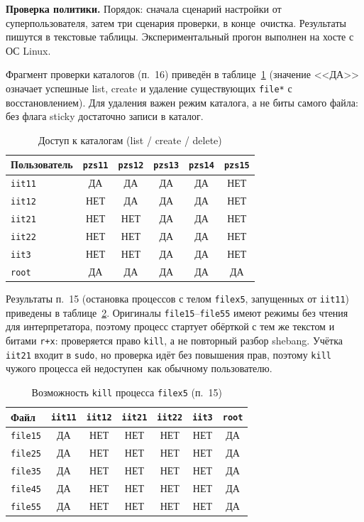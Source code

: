 \textbf{Проверка политики.}
Порядок: сначала сценарий настройки от суперпользователя, затем три сценария проверки, в конце~\mdash  очистка. Результаты пишутся в текстовые таблицы. Экспериментальный прогон выполнен на хосте с ОС Linux.

Фрагмент проверки каталогов (п.~16) приведён в таблице~\ref{tab:p1-dirs-res} (значение <<ДА>> означает успешные list, create и удаление существующих \texttt{file*} с восстановлением). Для удаления важен режим каталога, а не биты самого файла: без флага sticky достаточно записи в каталог.

\begin{table}[ht]
	\begin{tabularx}{\textwidth}{|l|c|c|c|c|c|}
		\hline
		\textbf{Пользователь} & \texttt{pzs11} & \texttt{pzs12} & \texttt{pzs13} & \texttt{pzs14} & \texttt{pzs15} \\
		\hline
		\texttt{iit11} & ДА & ДА & ДА & ДА & НЕТ \\
		\hline
		\texttt{iit12} & НЕТ & ДА & ДА & ДА & НЕТ \\
		\hline
		\texttt{iit21} & НЕТ & НЕТ & ДА & ДА & НЕТ \\
		\hline
		\texttt{iit22} & НЕТ & НЕТ & ДА & ДА & НЕТ \\
		\hline
		\texttt{iit3} & НЕТ & НЕТ & ДА & ДА & НЕТ \\
		\hline
		\texttt{root} & ДА & ДА & ДА & ДА & ДА \\
		\hline
	\end{tabularx}
	\caption{Доступ к каталогам (list / create / delete)}
	\label{tab:p1-dirs-res}
\end{table}

Результаты п.~15 (остановка процессов с телом \texttt{filex5}, запущенных от \texttt{iit11}) приведены в таблице~\ref{tab:p1-procs}. Оригиналы \texttt{file15}--\texttt{file55} имеют режимы без чтения для интерпретатора, поэтому процесс стартует обёрткой с тем же текстом и битами \texttt{r+x}: проверяется право \texttt{kill}, а не повторный разбор shebang. Учётка \texttt{iit21} входит в \texttt{sudo}, но проверка идёт без повышения прав, поэтому \texttt{kill} чужого процесса ей недоступен~\mdash  как обычному пользователю.

\begin{table}[ht]
	\begin{tabularx}{\textwidth}{|l|c|c|c|c|c|c|}
		\hline
		\textbf{Файл} & \texttt{iit11} & \texttt{iit12} & \texttt{iit21} & \texttt{iit22} & \texttt{iit3} & \texttt{root} \\
		\hline
		\texttt{file15} & ДА & НЕТ & НЕТ & НЕТ & НЕТ & ДА \\
		\hline
		\texttt{file25} & ДА & НЕТ & НЕТ & НЕТ & НЕТ & ДА \\
		\hline
		\texttt{file35} & ДА & НЕТ & НЕТ & НЕТ & НЕТ & ДА \\
		\hline
		\texttt{file45} & ДА & НЕТ & НЕТ & НЕТ & НЕТ & ДА \\
		\hline
		\texttt{file55} & ДА & НЕТ & НЕТ & НЕТ & НЕТ & ДА \\
		\hline
	\end{tabularx}
	\caption{Возможность \texttt{kill} процесса \texttt{filex5} (п.~15)}
	\label{tab:p1-procs}
\end{table}

